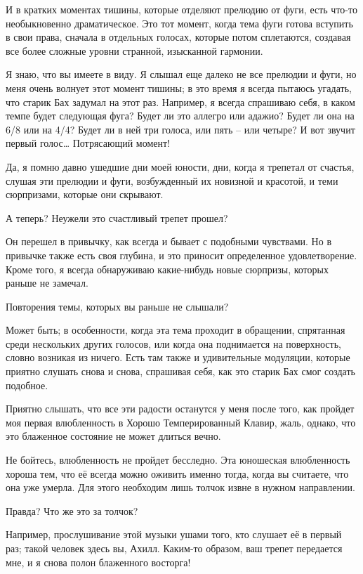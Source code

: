 \documentclass[../main.tex]{subfiles}
\begin{document}
\begin{dialogue}
 И в кратких моментах тишины, которые отделяют прелюдию от фуги, есть что-то необыкновенно драматическое. Это тот момент, когда тема фуги готова вступить в свои права, сначала в отдельных голосах, которые потом сплетаются, создавая все более сложные уровни странной, изысканной гармонии.

 Я знаю, что вы имеете в виду. Я слышал еще далеко не все прелюдии и фуги, но меня очень волнует этот момент тишины; в это время я всегда пытаюсь угадать, что старик Бах задумал на этот раз. Например, я всегда спрашиваю себя, в каком темпе будет следующая фуга? Будет ли это аллегро или адажио? Будет ли она на 6/8 или на 4/4? Будет ли в ней три голоса, или пять \--- или четыре? И вот звучит первый голос\ldots{} Потрясающий момент!

 Да, я помню давно ушедшие дни моей юности, дни, когда я трепетал от счастья, слушая эти прелюдии и фуги, возбужденный их новизной и красотой, и теми сюрпризами, которые они скрывают.

 А теперь? Неужели это счастливый трепет прошел?

 Он перешел в привычку, как всегда и бывает с подобными чувствами. Но в привычке также есть своя глубина, и это приносит определенное удовлетворение. Кроме того, я всегда обнаруживаю какие-нибудь новые сюрпризы, которых раньше не замечал.

 Повторения темы, которых вы раньше не слышали?

 Может быть; в особенности, когда эта тема проходит в обращении, спрятанная среди нескольких других голосов, или когда она поднимается на поверхность, словно возникая из ничего. Есть там также и удивительные модуляции, которые приятно слушать снова и снова, спрашивая себя, как это старик Бах смог создать подобное.

 Приятно слышать, что все эти радости останутся у меня после того, как пройдет моя первая влюбленность в Хорошо Темперированный Клавир, жаль, однако, что это блаженное состояние не может длиться вечно.

 Не бойтесь, влюбленность не пройдет бесследно. Эта юношеская влюбленность хороша тем, что её всегда можно оживить именно тогда, когда вы считаете, что она уже умерла. Для этого необходим лишь толчок извне в нужном направлении.

 Правда? Что же это за толчок?

 Например, прослушивание этой музыки ушами того, кто слушает её в первый раз; такой человек здесь вы, Ахилл. Каким-то образом, ваш трепет передается мне, и я снова полон блаженного восторга!


\end{dialogue}
\end{document}
